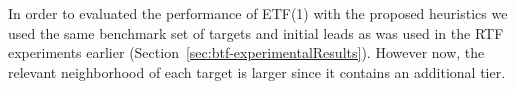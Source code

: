 \documentclass[prodmode,acmtecs]{acmsmall} %
\newcommand{\note}[2]{\textbf{\textsc{#1} says: \textit{#2}}}
\begin{document}






In order to evaluated the performance of ETF(1) with the proposed heuristics we used the same benchmark set of targets and initial leads as was used in the RTF experiments earlier (Section~\ref{sec:btf-experimentalResults}). However now, the relevant neighborhood of each target is larger since it contains an additional tier. 
\end{document}

